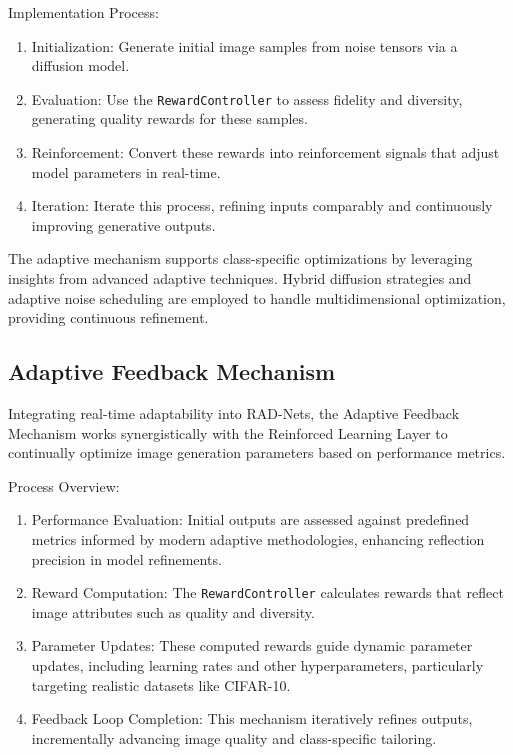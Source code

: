 \documentclass{article} %
\begin{document}
Implementation Process:
\begin{enumerate}
    \item Initialization: Generate initial image samples from noise tensors via a diffusion model.
    \item Evaluation: Use the \texttt{RewardController} to assess fidelity and diversity, generating quality rewards for these samples.
    \item Reinforcement: Convert these rewards into reinforcement signals that adjust model parameters in real-time.
    \item Iteration: Iterate this process, refining inputs comparably and continuously improving generative outputs.
\end{enumerate}

The adaptive mechanism supports class-specific optimizations by leveraging insights from advanced adaptive techniques. Hybrid diffusion strategies and adaptive noise scheduling are employed to handle multidimensional optimization, providing continuous refinement.

\subsection{Adaptive Feedback Mechanism}

Integrating real-time adaptability into RAD-Nets, the Adaptive Feedback Mechanism works synergistically with the Reinforced Learning Layer to continually optimize image generation parameters based on performance metrics. 

Process Overview:
\begin{enumerate}
    \item Performance Evaluation: Initial outputs are assessed against predefined metrics informed by modern adaptive methodologies, enhancing reflection precision in model refinements.
    \item Reward Computation: The \texttt{RewardController} calculates rewards that reflect image attributes such as quality and diversity.
    \item Parameter Updates: These computed rewards guide dynamic parameter updates, including learning rates and other hyperparameters, particularly targeting realistic datasets like CIFAR-10.
    \item Feedback Loop Completion: This mechanism iteratively refines outputs, incrementally advancing image quality and class-specific tailoring.
\end{enumerate}
\end{document}
